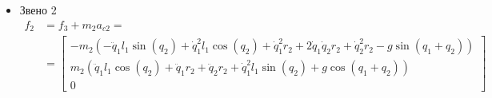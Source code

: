 \documentclass[a4paper,14pt]{extreport}
\begin{document}
\begin{itemize}
\item Звено 2
\begin{align*}
f_2 &= f_3 + m_2 a_{c2} =\\
&=
\left[\begin{matrix}- m_{2} \left(- \ddot{q}_1 l_{1} \sin{\left (q_{2} \right )} + \dot{q}_1^{2} l_{1} \cos{\left (q_{2} \right )} + \dot{q}_1^{2} r_{2} + 2 \dot{q}_1 \dot{q}_2 r_{2} + \dot{q}_2^{2} r_{2} - g \sin{\left (q_{1} + q_{2} \right )}\right)\\m_{2} \left(\ddot{q}_1 l_{1} \cos{\left (q_{2} \right )} + \ddot{q}_1 r_{2} + \ddot{q}_2 r_{2} + \dot{q}_1^{2} l_{1} \sin{\left (q_{2} \right )} + g \cos{\left (q_{1} + q_{2} \right )}\right)\\0\end{matrix}\right]
\end{align*}


\end{itemize}
\end{document}
